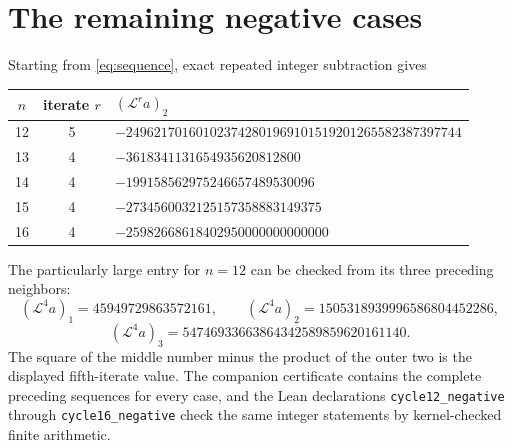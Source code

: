 \section{The remaining negative cases}
Starting from \eqref{eq:sequence}, exact repeated integer subtraction gives
\begin{center}
\begin{tabular}{ccl}
\toprule
$n$ & iterate $r$ & $(\mathcal L^r a)_2$\\\midrule
12 & 5 & $-249621701601023742801969101519201265582387397744$\\
13 & 4 & $-3618341131654935620812800$\\
14 & 4 & $-199158562975246657489530096$\\
15 & 4 & $-2734560032125157358883149375$\\
16 & 4 & $-25982668618402950000000000000$\\\bottomrule
\end{tabular}
\end{center}
The particularly large entry for $n=12$ can be checked from its three
preceding neighbors:
\[
 (\mathcal L^4 a)_1=45949729863572161,\qquad
 (\mathcal L^4 a)_2=1505318939996586804452286,
\]
\[
 (\mathcal L^4 a)_3=54746933663864342589859620161140.
\]
The square of the middle number minus the product of the outer two is
the displayed fifth-iterate value. The companion certificate contains the
complete preceding sequences for every case, and the Lean declarations
\texttt{cycle12\_negative} through \texttt{cycle16\_negative} check the same
integer statements by kernel-checked finite arithmetic.

